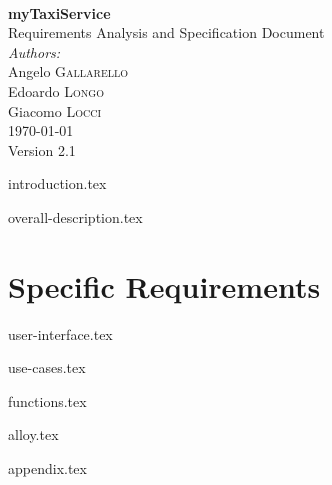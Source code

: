\documentclass[12pt, a4paper]{article}
\begin{document}
\begin{titlepage}
 


\HRule \\[0.4cm]
{ \huge \bfseries myTaxiService} \\[0.2cm]%
	{\Large Requirements Analysis and Specification Document}
\HRule \\[1.5cm]
 


\large \emph{Authors:}\\
Angelo  \textsc{Gallarello}\\
Edoardo  \textsc{Longo}\\
Giacomo  \textsc{Locci}\\[1.5cm]


{\large \today \\ Version 2.1} %



\vfill %

\end{titlepage}

\newpage

\tableofcontents

\newpage

{introduction.tex}

{overall-description.tex}

\newpage
\vfill
\section{Specific Requirements} %
\label{sec:specific-requirements}

{user-interface.tex}

{use-cases.tex}

{functions.tex}

{alloy.tex}

{appendix.tex}
\end{document}
